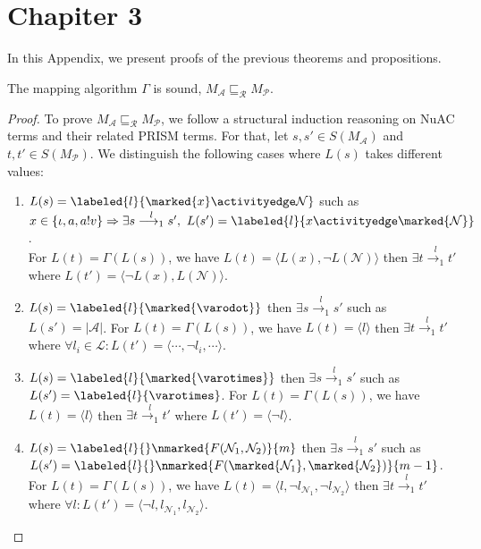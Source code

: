 \chapter{Chapiter 3}
In this Appendix, we present proofs of the previous theorems and propositions. %

\begin{lemma}[Soundness]
The mapping algorithm $\Gamma$ is sound, \ie $M_\mathcal{A}\sqsubseteq_{\mathscr{R}}M_\mathcal{P}$.
\end{lemma}
\begin{proof}
To prove $M_\mathcal{A}\sqsubseteq_{\mathcal{R}}M_\mathcal{P}$, we follow a structural induction reasoning on NuAC terms and their related PRISM terms. For that, let $s,s'\in S(M_\mathcal{A})$ and $t,t'\in S(M_\mathcal{P})$. We distinguish the following cases where $L(s)$ takes different values:
\begin{enumerate}
  \item $L(s)=\labeled{l}{\marked{x}\activityedge\mathcal{N}}$ such as $x\in\{\iota,a,a!v\}\Rightarrow\exists s\stackrel{l}{\longrightarrow_{1}}s',~L(s')=\labeled{l}{x\activityedge\marked{\mathcal{N}}}$.\\
      For $L(t)=\Gamma(L(s))$, we have $L(t)=\langle L(x),\neg L(\mathcal{N})\rangle$ then $\exists t\stackrel{l}{\longrightarrow_{1}}t'$ where  $L(t')=\langle\neg L(x), L(\mathcal{N})\rangle$.
  \item $L(s)=\labeled{l}{\marked{\varodot}}$ then $\exists s\stackrel{l}{\longrightarrow_{1}}s'$ such as $L(s')=\lvert\mathcal{A}\rvert$. For $L(t)=\Gamma(L(s))$, we have  $L(t)=\langle l \rangle$ then $\exists t\stackrel{l}{\longrightarrow_{1}}t'$ where $\forall l_i\in\mathcal{L}: L(t')=\langle\cdots,\neg l_i,\cdots\rangle$. %
  \item $L(s)=\labeled{l}{\marked{\varotimes}}$ then $\exists s\stackrel{l}{\longrightarrow_{1}}s'$ such as $L(s')=\labeled{l}{\varotimes}$. For $L(t)=\Gamma(L(s))$, we have  $L(t)=\langle l\rangle$ then $\exists t\stackrel{l}{\longrightarrow_{1}}t'$ where $L(t')=\langle\neg l\rangle$. %
  \item $L(s)=\labeled{l}{}\nmarked{F(\mathcal{N}_{1},\mathcal{N}_{2})}{m}$ then $\exists s\stackrel{l}{\longrightarrow_{1}}s'$ such as $L(s')=\labeled{l}{}\nmarked{F(\marked{\mathcal{N}_{1}},\marked{\mathcal{N}_{2}})}{m-1}$. For $L(t)=\Gamma(L(s))$, we have  $L(t)=\langle l,\neg l_{\mathcal{N}_{1}},\neg l_{\mathcal{N}_{2}}\rangle$ then $\exists t\stackrel{l}{\longrightarrow_{1}}t'$ where $\forall l: L(t')=\langle\neg l, l_{\mathcal{N}_{1}}, l_{\mathcal{N}_{2}}\rangle$. %
\end{enumerate}


\end{proof}
